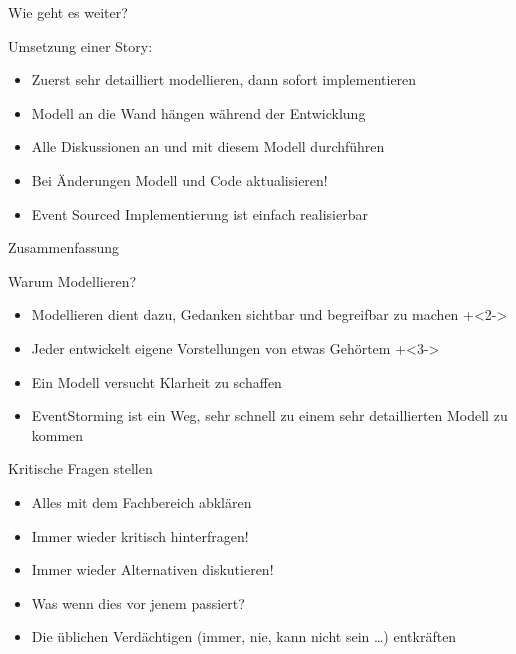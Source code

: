 \begin{frame}[fragile]{Wie geht es weiter?}

Umsetzung einer Story:

\begin{itemize}
\item Zuerst sehr detailliert modellieren, dann sofort implementieren
\item Modell an die Wand hängen während der Entwicklung
\item Alle Diskussionen an und mit diesem Modell durchführen
\item Bei Änderungen Modell und Code aktualisieren!
\item Event Sourced Implementierung ist einfach realisierbar
\end{itemize}

\end{frame}

\begin{frame}[fragile]{}

\begin{center}
{
\LARGE
Zusammenfassung
}
\end{center}

\end{frame}

\begin{frame}[fragile]{Warum Modellieren?}

\begin{itemize}
\item Modellieren dient dazu, Gedanken sichtbar und \glqq begreifbar\grqq{} zu machen
\onslide+<2->
\item Jeder entwickelt eigene Vorstellungen von etwas Gehörtem
\onslide+<3->
\item Ein Modell versucht Klarheit zu schaffen
\item EventStorming ist ein Weg, sehr schnell zu einem sehr detaillierten Modell zu kommen
\end{itemize}

\end{frame}

\begin{frame}[fragile]{Kritische Fragen stellen}

\begin{itemize}
\item Alles mit dem Fachbereich abklären
\item Immer wieder kritisch hinterfragen!
\item Immer wieder Alternativen diskutieren!
\item \glqq Was wenn dies vor jenem passiert?\grqq
\item Die üblichen Verdächtigen (\glqq immer\grqq, \glqq nie\grqq, \glqq kann nicht sein\grqq{} \ldots) entkräften
\end{itemize}

\end{frame}

